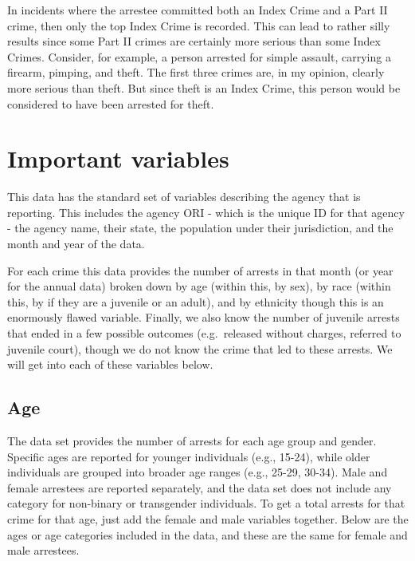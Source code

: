 \documentclass[
]{krantz}
\begin{document}
In incidents where the arrestee committed both an Index
Crime and a Part II crime, then only the top Index Crime is
recorded. This can lead to rather silly results since some
Part II crimes are certainly more serious than some Index
Crimes. Consider, for example, a person arrested for simple
assault, carrying a firearm, pimping, and theft. The first
three crimes are, in my opinion, clearly more serious than
theft. But since theft is an Index Crime, this person would
be considered to have been arrested for theft.

\section{Important variables}\label{important-variables-2}

This data has the standard set of variables describing the
agency that is reporting. This includes the agency ORI -
which is the unique ID for that agency - the agency name,
their state, the population under their jurisdiction, and
the month and year of the data.

For each crime this data provides the number of arrests in
that month (or year for the annual data) broken down by age
(within this, by sex), by race (within this, by if they are
a juvenile or an adult), and by ethnicity though this is an
enormously flawed variable. Finally, we also know the number
of juvenile arrests that ended in a few possible outcomes
(e.g.~released without charges, referred to juvenile court),
though we do not know the crime that led to these arrests.
We will get into each of these variables below.

\subsection{Age}\label{age}

The data set provides the number of arrests for each age
group and gender. Specific ages are reported for younger
individuals (e.g., 15-24), while older individuals are
grouped into broader age ranges (e.g., 25-29, 30-34). Male
and female arrestees are reported separately, and the
data set does not include any category for non-binary or
transgender individuals. To get a total arrests for that
crime for that age, just add the female and male variables
together. Below are the ages or age categories included in
the data, and these are the same for female and male
arrestees.
\end{document}
